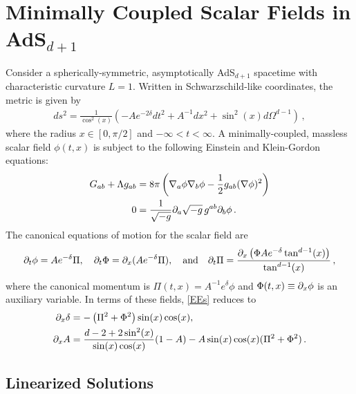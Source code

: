 \documentclass[../PhD.tex]{subfiles}
\begin{document}
\section{Minimally Coupled Scalar Fields in AdS$_{d+1}$}
\label{sec: scalar in AdS}

Consider a spherically-symmetric, asymptotically AdS$_{d+1}$ spacetime with characteristic curvature $L=1$. Written in Schwarzschild-like coordinates, the metric is given by
\begin{align}
ds^2 = \frac{1}{\cos^2(x)} \left( -Ae^{-2\delta} dt^2 + A^{-1}dx^2 + \sin^2(x) d\Omega^{d-1}\right) \, ,
\end{align}
where the radius $x \in [0,\pi/2]$ and $-\infty < t < \infty$. A minimally-coupled, massless scalar field $\phi(t,x)$ is subject to the following Einstein and Klein-Gordon equations:
\begin{align}
\label{EEs}
G_{ab} + \Lambda g_{ab} &= 8\pi \left( \nabla_a \phi \nabla_b \phi - \frac{1}{2} g_{ab} (\nabla \phi)^2 \right) \\
\label{KG}
0 &= \frac{1}{\sqrt{-g}} \partial_a \sqrt{-g} \, g^{ab} \partial_b \phi \, .
\end{align}
The canonical equations of motion for the scalar field are
\begin{align}
\partial_t \phi = A e^{-\delta} \Pi, \quad \partial_t \Phi = \partial_x ( A e^{-\delta} \Pi), \quad \text{and} \quad \partial_t \Pi = \frac{\partial_x \left(\Phi A e^{-\delta} \tan^{d-1} (x) \right)}{\tan^{d-1}(x)} \, ,
\end{align}
where the canonical momentum is $\Pi(t,x) = A^{-1}e^\delta \phi$ and $\Phi(t,x) \equiv \partial_x \phi$ is an auxiliary variable. In terms of these fields, \eqref{EEs} reduces to 
\begin{align}
	\label{EE const1}
	\partial_x \delta &= - \left( \Pi^2 + \Phi^2 \right) \sin(x) \cos(x), \\
	\label{EE const2}
	\partial_x A &= \frac{d - 2 + 2\sin^2(x)}{\sin (x)\cos(x)} (1 - A) - A \sin(x) \cos(x) (\Pi^2 + \Phi^2) \, .
\end{align}


\subsection{Linearized Solutions}
\end{document}
